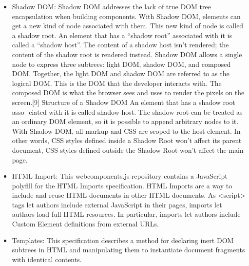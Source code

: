 \begin{itemize}
\item Shadow DOM: Shadow DOM addresses the lack of true DOM tree encapsulation when building components. With Shadow DOM, elements can get a new kind of node associated with them. This new kind of node is called a shadow root.  An element that has a “shadow root”  associated with it is called  a “shadow host”. The content of a shadow host isn’t rendered; the content of the shadow root is rendered instead.  Shadow DOM allows   a single node to express three subtrees:  light DOM, shadow DOM,  and composed DOM. Together, the light DOM and shadow DOM are referred to as the logical DOM. This is the DOM that the developer interacts with. The composed DOM is what the browser sees and uses to render the pixels on the  screen.[9]
\newline
Structure of a Shadow DOM An element that has a shadow root asso- ciated with it is called shadow host. The shadow root can be treated as an ordinary DOM element, so it is possible to append arbitrary nodes to it. With Shadow DOM, all markup and CSS are scoped to the host element. In other words, CSS styles defined inside a Shadow Root won’t affect its parent document, CSS styles defined outside the Shadow Root won’t affect the main page.
\end{itemize}
\begin{itemize}
\item HTML Import: This webcomponents.js repository contains a  JavaScript  polyfill  for the HTML Imports specification. HTML Imports are a way to include and reuse HTML documents in other HTML documents. As <script> tags let authors include external JavaScript in their pages, imports let authors load full HTML resources. In particular, imports let authors include Custom Element definitions from external URLs.
\end{itemize}
\begin{itemize}
\item Templates: This specification describes a method for declaring inert DOM subtrees in HTML and manipulating them to instantiate document fragments with identical contents.
\end{itemize}